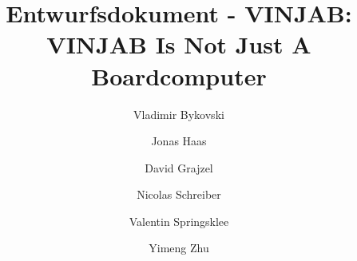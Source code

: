 \documentclass[a4paper]{scrreprt}
\begin{document}
\title{Entwurfsdokument - VINJAB: VINJAB Is Not Just A Boardcomputer}
\author{Vladimir Bykovski 
			\and Jonas Haas 
			\and David Grajzel 
			\and Nicolas Schreiber
			\and Valentin Springsklee
			\and Yimeng Zhu}


\maketitle

\newpage
\setcounter{page}{1} %


\tableofcontents

\newpage
{}










\end{document}
